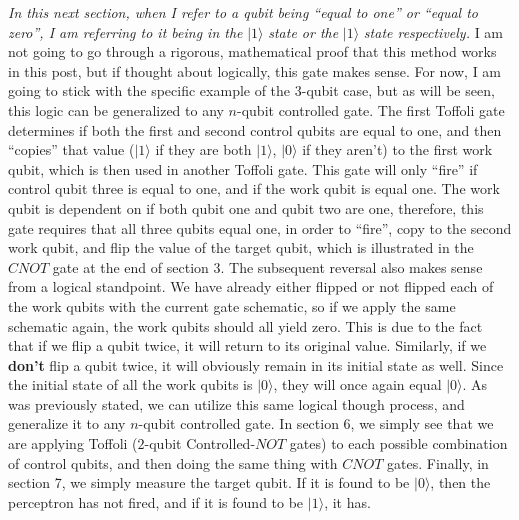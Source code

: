 \documentclass{article}
\begin{document}
\newline\newline
\textit{In this next section, when I refer to a qubit being “equal to one” or “equal to zero”, I am referring to it being in the} $|1\rangle$\textit{ state or the} $|1\rangle$ \textit{state respectively.}
\newline\newline
I am not going to go through a rigorous, mathematical proof that this method works in this post, but if thought about logically, this gate makes sense. For now, I am going to stick with the specific example of the $3$-qubit case, but as will be seen, this logic can be generalized to any $n$-qubit controlled gate. The first Toffoli gate determines if both the first and second control qubits are equal to one, and then “copies” that value ($|1\rangle$ if they are both $|1\rangle$, $|0\rangle$ if they aren’t) to the first work qubit, which is then used in another Toffoli gate. This gate will only “fire” if control qubit three is equal to one, and if the work qubit is equal one. The work qubit is dependent on if both qubit one and qubit two are one, therefore, this gate requires that all three qubits equal one, in order to “fire”, copy to the second work qubit, and flip the value of the target qubit, which is illustrated in the $CNOT$ gate at the end of section $3$. The subsequent reversal also makes sense from a logical standpoint. We have already either flipped or not flipped each of the work qubits with the current gate schematic, so if we apply the same schematic again, the work qubits should all yield zero. This is due to the fact that if we flip a qubit twice, it will return to its original value. Similarly, if we \textbf{don’t} flip a qubit twice, it will obviously remain in its initial state as well. Since the initial state of all the work qubits is $|0\rangle$, they will once again equal $|0\rangle$.
\newline\newline
As was previously stated, we can utilize this same logical though process, and generalize it to any $n$-qubit controlled gate.
\newline\newline
In section 6, we simply see that we are applying Toffoli ($2$-qubit Controlled-$NOT$ gates) to each possible combination of control qubits, and then doing the same thing with $CNOT$ gates. Finally, in section 7, we simply measure the target qubit. If it is found to be $|0\rangle$, then the perceptron has not fired, and if it is found to be $|1\rangle$, it has.
\end{document}
